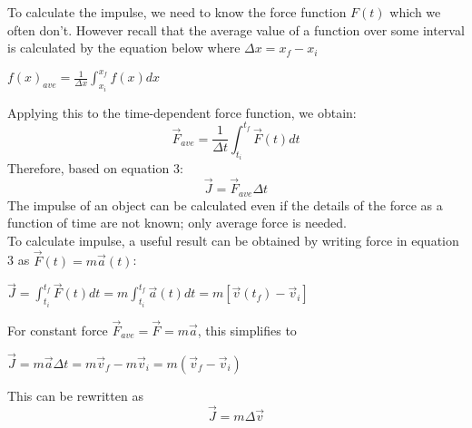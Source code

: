 \documentclass[a4paper]{article}
\begin{document}
To calculate the impulse, we need to know the force function $F(t)$ which we often don't. However recall that the average value of a function over some interval is calculated by the equation below where $\Delta x = x_f - x_i$
\begin{center}
    $\displaystyle f(x)_{ave} = \frac{1}{\Delta x}\int_{x_i}^{x_f}f(x)dx$
\end{center}
Applying this to the time-dependent force function, we obtain:
\begin{equation}
    \vec{F}_{ave} = \frac{1}{\Delta t}\int_{t_i}^{t_f}\vec{F}(t)dt
\end{equation}
Therefore, based on equation 3:
\begin{equation}
    \vec{J} = \vec{F}_{ave}\Delta t
\end{equation}
The impulse of an object can be calculated even if the details of the force as a function of time are not known; only average force is needed.
\vspace{1mm}\\
To calculate impulse, a useful result can be obtained by writing force in equation 3 as $\vec{F}(t) = m\vec{a}(t)$:
\begin{center}
    $\displaystyle \vec{J} = \int_{t_i}^{t_f}\vec{F}(t)dt = m\int_{t_i}^{t_f}\vec{a}(t)dt = m[\vec{v}(t_f) - \vec{v}_i]$
\end{center}
For constant force $\vec{F}_{ave} = \vec{F} = m\vec{a}$, this simplifies to 
\begin{center}
    $\vec{J} = m\vec{a}\Delta t = m\vec{v}_f - m\vec{v}_i = m(\vec{v}_f - \vec{v}_i)$
\end{center}
This can be rewritten as
\begin{equation}
    \vec{J} = m\Delta\vec{v}
\end{equation}
\newpage
\end{document}

